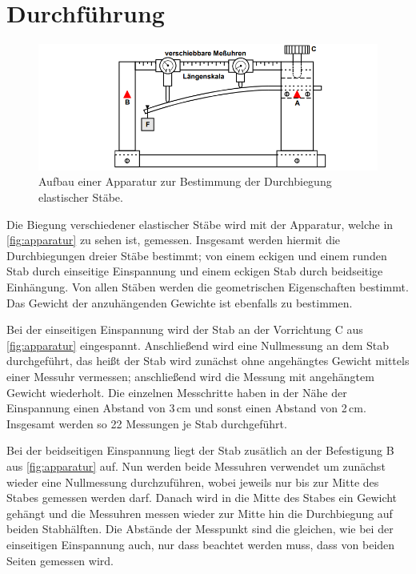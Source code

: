 \section{Durchführung}
\label{sec:Durchführung}

    \begin{figure}
      \centering
      \includegraphics{content/apparatur.png}
      \caption{Aufbau einer Apparatur zur Bestimmung der Durchbiegung elastischer Stäbe. \cite{V103-s111}}
      \label{fig:apparatur}
    \end{figure}
    
    Die Biegung verschiedener elastischer Stäbe wird mit der Apparatur, welche in \autoref{fig:apparatur} zu sehen ist, gemessen.
    Insgesamt werden hiermit die Durchbiegungen dreier Stäbe bestimmt; von einem eckigen und einem runden Stab durch einseitige Einspannung
    und einem eckigen Stab durch beidseitige Einhängung. Von allen Stäben werden die geometrischen Eigenschaften bestimmt.
    Das Gewicht der anzuhängenden Gewichte ist ebenfalls zu bestimmen.


    Bei der einseitigen Einspannung wird der Stab an der Vorrichtung C aus \autoref{fig:apparatur} eingespannt. Anschließend wird eine Nullmessung 
    an dem Stab durchgeführt, das heißt der Stab wird zunächst ohne angehängtes Gewicht mittels einer Messuhr vermessen; anschließend
    wird die Messung mit angehängtem Gewicht wiederholt. Die einzelnen Messchritte haben in der Nähe der Einspannung einen Abstand von
    3\,cm und sonst einen Abstand von 2\,cm. Insgesamt werden so 22 Messungen je Stab durchgeführt.


    Bei der beidseitigen Einspannung liegt der Stab zusätlich an der Befestigung B aus \autoref{fig:apparatur} auf. Nun werden beide Messuhren verwendet
    um zunächst wieder eine Nullmessung durchzuführen, wobei jeweils nur bis zur Mitte des Stabes gemessen werden darf. 
    Danach wird in die Mitte des Stabes ein Gewicht gehängt und die Messuhren messen wieder zur Mitte hin die Durchbiegung auf
    beiden Stabhälften. Die Abstände der Messpunkt sind die gleichen, wie bei der einseitigen Einspannung auch, nur dass beachtet
    werden muss, dass von beiden Seiten gemessen wird.